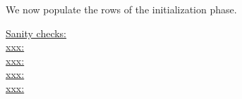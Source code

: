 \begin{center}
\end{center}
We now populate the rows of the initialization phase.
\begin{description}
	\item[\underline{\underline{Sanity checks:}}]
	\item[\underline{\underline{xxx:}}]
	\item[\underline{\underline{xxx:}}]
	\item[\underline{\underline{xxx:}}]
	\item[\underline{\underline{xxx:}}]
\end{description}
